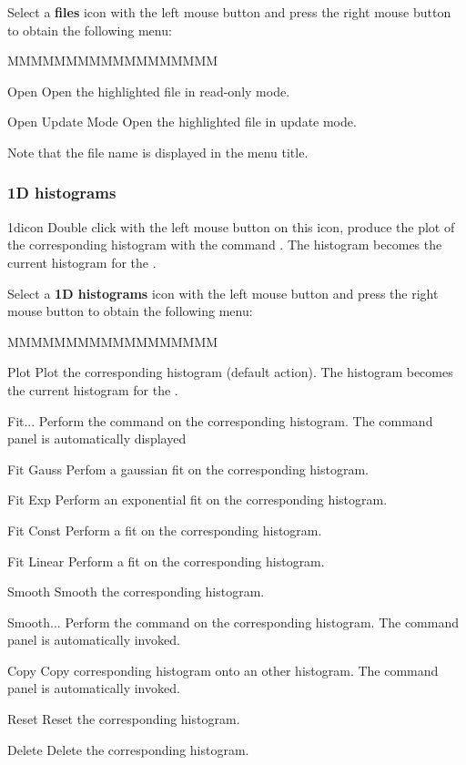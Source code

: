 Select a {\bf \HBOOK{} files} icon with the left mouse button and press
the right mouse button to obtain the following menu:


\begin{DLsf}{MMMMMMMMMMMMMMMMMM}
\item[Open]              Open the highlighted \HBOOK{} file in read-only mode.
\item[Open Update Mode]  Open the highlighted \HBOOK{} file in update mode.
\end{DLsf}

Note that the \HBOOK{} file name is displayed in the menu title.


\subsubsection{1D histograms}
\begin{ICON}{1dicon}
Double click with the left mouse button on this icon, produce the plot of the
corresponding histogram with the command  . The histogram
becomes the current histogram for the \HSP.
\end{ICON}

Select a {\bf 1D histograms} icon with the left mouse button and press
the right mouse button to obtain the following menu:


\begin{DLsf}{MMMMMMMMMMMMMMMMMM}
\item[Plot]         Plot the corresponding histogram (default action). The
                    histogram becomes the current histogram for the \HSP.
\item[Fit...]       Perform the command  on the corresponding
                    histogram. The command panel is automatically displayed
\item[Fit Gauss]    Perfom a gaussian fit on the corresponding histogram.
\item[Fit Exp]      Perform an exponential fit on the corresponding histogram.
\item[Fit Const]    Perform a  fit on the corresponding histogram.
\item[Fit Linear]   Perform a  fit on the corresponding histogram.
\item[Smooth]       Smooth the corresponding histogram.
\item[Smooth...]    Perform the command  on the corresponding
                    histogram. The command panel is automatically invoked.
\item[Copy ]        Copy corresponding histogram onto an other histogram.
                    The command panel is automatically invoked.
\item[Reset ]       Reset the corresponding histogram.
\item[Delete]       Delete the corresponding histogram.
\end{DLsf}

